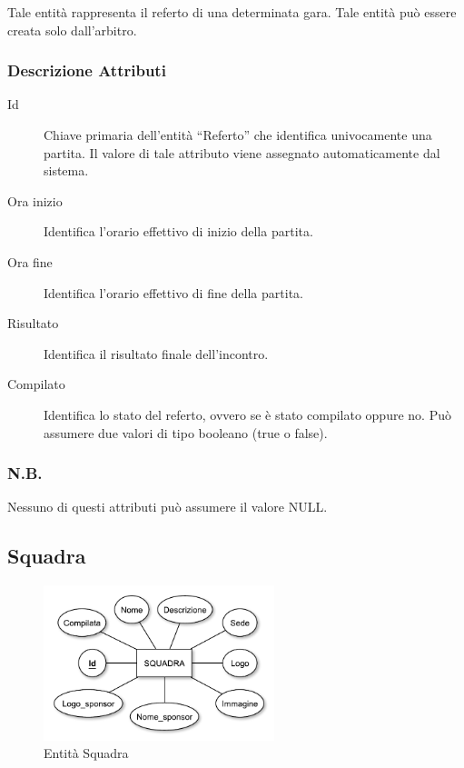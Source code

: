 		Tale entità rappresenta il referto di una determinata gara. Tale entità può essere creata solo dall'arbitro.
		
		\subsubsection*{Descrizione Attributi}
		
		\begin{description}
			
			\item[Id]
			Chiave primaria dell'entità ``Referto'' che identifica univocamente una partita. Il valore di tale attributo viene assegnato automaticamente dal sistema.
			
			\item[Ora inizio]
			Identifica l'orario effettivo di inizio della partita.
			
			\item[Ora fine]
			Identifica l'orario effettivo di fine della partita.
			
			\item[Risultato]
			Identifica il risultato finale dell'incontro.
			
			\item[Compilato]
			Identifica lo stato del referto, ovvero se è stato compilato oppure no. Può assumere due valori di tipo booleano (true o false).
			
		\end{description}
		
		\subsubsection*{N.B.}
		Nessuno di questi attributi può assumere il valore NULL.
	
	\subsection{Squadra}
	
		\begin{figure}[h]
			\centering
			\includegraphics[width=0.6\textwidth]
			{immagini/09-squadra}
			
			\caption{Entità Squadra}
		\end{figure}
		
